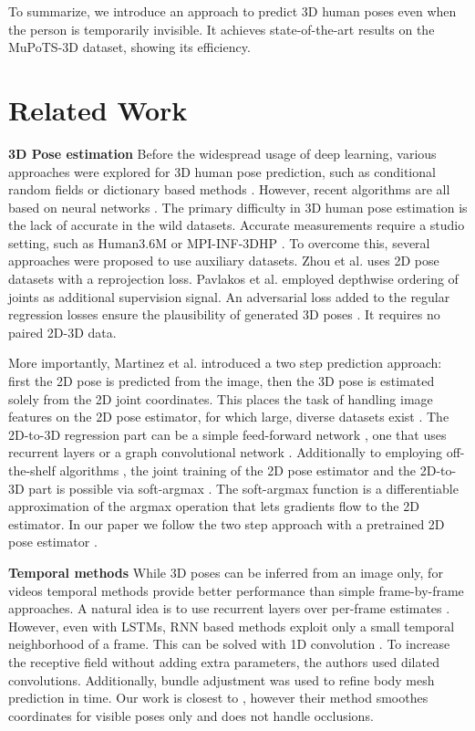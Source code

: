 \documentclass[runningheads, envcountsame, a4paper]{llncs}
\begin{document}
To summarize, we introduce an approach to predict 3D human poses even when the person is temporarily invisible. It achieves state-of-the-art results on the MuPoTS-3D dataset, showing its efficiency.

\section{Related Work}
\textbf{3D Pose estimation} Before the widespread usage of deep learning, various approaches were explored for 3D human pose prediction, such as conditional random fields \cite{belagiannis2014pictorialpose} or dictionary based methods \cite{ramakrishna2012dictionary}. However, recent algorithms are all based on neural networks \cite{3dbaseline,pavlakos2018ordinal,integralPose}. The primary difficulty in 3D human pose estimation is the lack of accurate in the wild datasets. Accurate measurements require a studio setting, such as Human3.6M \cite{h36m} or MPI-INF-3DHP \cite{mehta}. To overcome this, several approaches were proposed to use auxiliary datasets. Zhou et al. \cite{zhou2017} uses 2D pose datasets with a reprojection loss. Pavlakos et al. \cite{pavlakos2018ordinal} employed depthwise ordering of joints as additional supervision signal. An adversarial loss added to the regular regression losses ensure the plausibility of generated 3D poses \cite{drover_2dto3d}. It requires no paired 2D-3D data.

More importantly, Martinez et al. \cite{3dbaseline} introduced a two step prediction approach: first the 2D pose is predicted from the image, then the 3D pose is estimated solely from the 2D joint coordinates. This places the task of handling image features on the 2D pose estimator, for which large, diverse datasets exist \cite{mscoco}. The 2D-to-3D regression part can be a simple feed-forward network \cite{3dbaseline}, one that uses recurrent layers \cite{fang2018posegrammar,lee2018pLSTM} or a graph convolutional network \cite{zhaoCVPR19semantic}. Additionally to employing off-the-shelf algorithms \cite{hrnet}, the joint training of the 2D pose estimator and the 2D-to-3D part is possible via soft-argmax \cite{Luvizon2018softargmax,integralPose}. The soft-argmax function is a differentiable approximation of the argmax operation that lets gradients flow to the 2D estimator. In our paper we follow the two step approach with a pretrained 2D pose estimator \cite{hrnet}.

\textbf{Temporal methods} While 3D poses can be inferred from an image only, for videos temporal methods provide better performance than simple frame-by-frame approaches. A natural idea is to use recurrent layers over per-frame estimates \cite{Hossain2017temporal}. However, even with LSTMs, RNN based methods exploit only a small temporal neighborhood of a frame. This can be solved with 1D convolution \cite{pavllo2019videopose3d}. To increase the receptive field without adding extra parameters, the authors used dilated convolutions. Additionally, bundle adjustment \cite{arnab2019meshbundle} was used to refine body mesh prediction in time. Our work is closest to \cite{arnab2019meshbundle}, however their method smoothes coordinates for visible poses only and does not handle occlusions.
\end{document}
